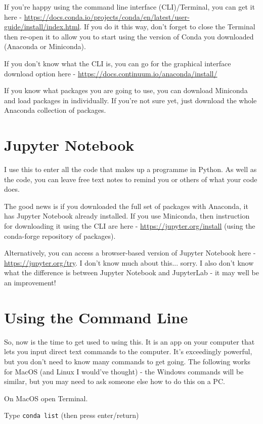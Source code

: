 \documentclass{article}
\newcommand{\code}[1]{\colorbox{light-gray}{\texttt{#1}}}
\begin{document}
If you're happy using the command line interface (CLI)/Terminal, you can get it here - \url{https://docs.conda.io/projects/conda/en/latest/user-guide/install/index.html}. If you do it this way, don't forget to close the Terminal then re-open it to allow you to start using the version of Conda you downloaded (Anaconda or Miniconda).  

If you don't know what the CLI is, you can go for the graphical interface download option here - \url{https://docs.continuum.io/anaconda/install/}

If you know what packages you are going to use, you can download Miniconda and load packages in individually. If you're not sure yet, just download the whole Anaconda collection of packages.

\section{Jupyter Notebook}
I use this to enter all the code that makes up a programme in Python. As well as the code, you can leave free text notes to remind you or others of what your code does. 

The good news is if you downloaded the full set of packages with Anaconda, it has Jupyter Notebook already installed. If you use Miniconda, then instruction for downloading it using the CLI are here - \url{https://jupyter.org/install} (using the conda-forge repository of packages).

Alternatively, you can access a browser-based version of Jupyter Notebook here - \url{https://jupyter.org/try}. I don't know much about this... sorry. I also don't know what the difference is between Jupyter Notebook and JupyterLab - it may well be an improvement! 



\section{Using the Command Line}
So, now is the time to get used to using this. It is an app on your computer that lets you input direct text commands to the computer. It's exceedingly powerful, but you don't need to know many commands to get going. The following works for MacOS (and Linux I would've thought) - the Windows commands will be similar, but you may need to ask someone else how to do this on a PC. 

On MacOS open Terminal.

Type \code{conda list} (then press enter/return)
\end{document}
